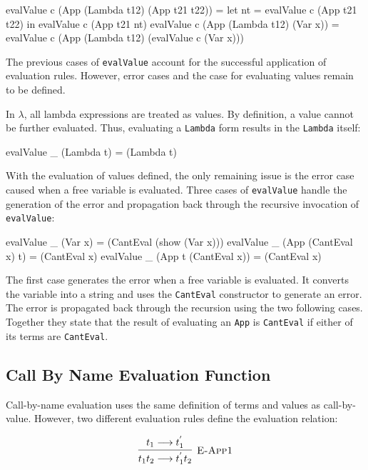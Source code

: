\documentclass[10pt]{article}
\begin{document}
\begin{code}
  evalValue c (App (Lambda t12) (App t21 t22)) =
      let nt = evalValue c (App t21 t22) in evalValue c (App t21 nt)
  evalValue c (App (Lambda t12) (Var x)) = 
      evalValue c (App (Lambda t12) (evalValue c (Var x)))
\end{code}

The previous cases of \texttt{evalValue} account for the successful
application of evaluation rules.  However, error cases and the case
for evaluating values remain to be defined.

In $\lambda$, all lambda expressions are treated as values.  By
definition, a value cannot be further evaluated.  Thus, evaluating a
\texttt{Lambda} form results in the \texttt{Lambda} itself:

\begin{code}
  evalValue _ (Lambda t) = (Lambda t)
\end{code}

With the evaluation of values defined, the only remaining issue is the
error case caused when a free variable is evaluated.  Three cases of
\texttt{evalValue} handle the generation of the error and propagation
back through the recursive invocation of \texttt{evalValue}:

\begin{code}
  evalValue _ (Var x) = (CantEval (show (Var x)))
  evalValue _ (App (CantEval x) t) = (CantEval x)
  evalValue _ (App t (CantEval x)) = (CantEval x)
\end{code}

The first case generates the error when a free variable is evaluated.
It converts the variable into a string and uses the \texttt{CantEval}
constructor to generate an error.  The error is propagated back
through the recursion using the two following cases.  Together they
state that the result of evaluating an \texttt{App} is
\texttt{CantEval} if either of its terms are \texttt{CantEval}.

\subsection{Call By Name Evaluation Function}

Call-by-name evaluation uses the same definition of terms and values
as call-by-value.  However, two different evaluation rules define the
evaluation relation:

\[\vcenter{\infer[\textsc{E-App1}]
  {t_1 t_2 \longrightarrow t_1^{'} t_2}
  {t_1\longrightarrow t_1^{'}}}\]
\end{document}
